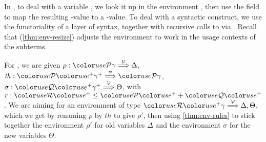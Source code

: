 
In , to deal with a variable , we look it
up in the environment \AgdaBound{$\rho$}, then use the
 field to map the resulting
\AgdaBound{$\V$}-value to a \AgdaBound{$\C$}-value.
To deal with a syntactic construct, we use the functoriality of a layer of
syntax, together with recursive calls to  via
.
Recall that  (\cref{thm:env-resize}) adjusts the
environment \AgdaBound{$\rho$} to work in the usage contexts of the subterms.


For , we are given
$\rho : \grP\gamma \env\V \Delta$,
$\mathit{th} : \grP\gr{^+}\gamma^+ \env\sqni \grP\gamma$,
$\sigma : \grQ\gr{^+}\gamma^+ \env\V \Theta$,
with $r : \grR\gr{^+} \leq \grP\gr{^+} + \grQ\gr{^+}$.
We are aiming for an environment of type
$\grR\gr{^+}\gamma \env\V \Delta, \Theta$, which we get by renaming $\rho$ by
$\mathit{th}$ to give $\rho'$, then using \cref{thm:env-rules} to stick
together the environment $\rho'$ for old variables $\Delta$ and the
environment $\sigma$ for the new variables $\Theta$.

